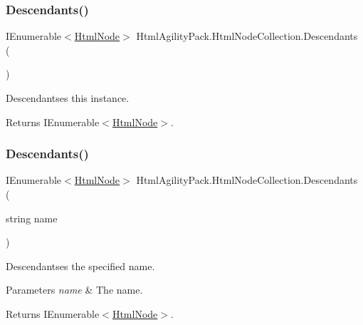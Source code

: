 \subsubsection{\texorpdfstring{Descendants()}{Descendants()}\hspace{0.1cm}{\footnotesize\ttfamily [1/2]}}
{\footnotesize\ttfamily I\+Enumerable$<$\hyperlink{class_html_agility_pack_1_1_html_node}{Html\+Node}$>$ Html\+Agility\+Pack.\+Html\+Node\+Collection.\+Descendants (\begin{DoxyParamCaption}{ }\end{DoxyParamCaption})\hspace{0.3cm}{\ttfamily [inline]}}



Descendantses this instance. 

\begin{DoxyReturn}{Returns}
I\+Enumerable$<$\hyperlink{class_html_agility_pack_1_1_html_node}{Html\+Node}$>$.
\end{DoxyReturn}
\mbox{\label{class_html_agility_pack_1_1_html_node_collection_a835992277dd1723c8d455c6c86471d87}} 
\subsubsection{\texorpdfstring{Descendants()}{Descendants()}\hspace{0.1cm}{\footnotesize\ttfamily [2/2]}}
{\footnotesize\ttfamily I\+Enumerable$<$\hyperlink{class_html_agility_pack_1_1_html_node}{Html\+Node}$>$ Html\+Agility\+Pack.\+Html\+Node\+Collection.\+Descendants (\begin{DoxyParamCaption}\item[{string}]{name }\end{DoxyParamCaption})\hspace{0.3cm}{\ttfamily [inline]}}



Descendantses the specified name. 


\begin{DoxyParams}{Parameters}
{\em name} & The name.\\
\hline
\end{DoxyParams}
\begin{DoxyReturn}{Returns}
I\+Enumerable$<$\hyperlink{class_html_agility_pack_1_1_html_node}{Html\+Node}$>$.
\end{DoxyReturn}
\mbox{\label{class_html_agility_pack_1_1_html_node_collection_a7c9a4b4455711b8f79b226cf0ab37465}} 

